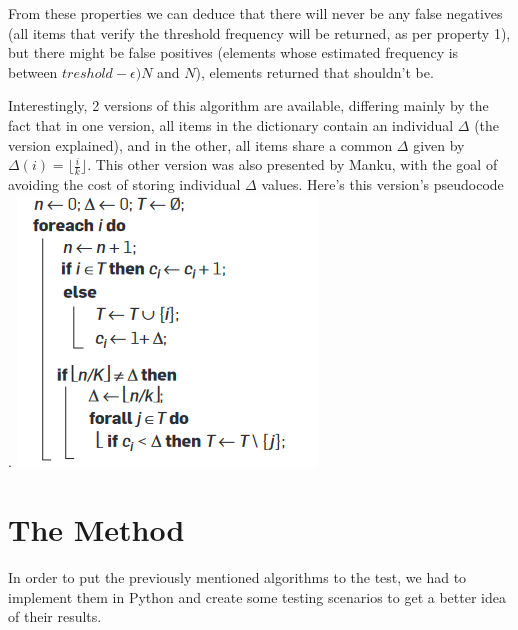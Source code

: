 \documentclass[...]{revdetua}
\begin{document}
From these properties we can deduce that there will never be any false negatives (all items that verify the threshold frequency will be returned, as per property 1), but there might be false positives (elements whose estimated frequency is between $treshold-\epsilon)N$ and $N$), elements returned that shouldn't be.\par
Interestingly, 2 versions of this algorithm are available, differing mainly by the fact that in one version, all items in the dictionary contain an individual $\Delta$ (the version explained), and in the other, all items share a common $\Delta$ given by $\Delta(i)=\lfloor{\frac{i}{k}}\rfloor$.
This other version was also presented by Manku, with the goal of avoiding the cost of storing individual $\Delta$ values.
Here's this version's pseudocode \cite{Cormode}.
\includegraphics[scale=1]{pseudo.png}
\section{The Method}
In order to put the previously mentioned algorithms to the test, we had to implement them in Python and create some testing scenarios to get a better idea of their results.
\end{document}
